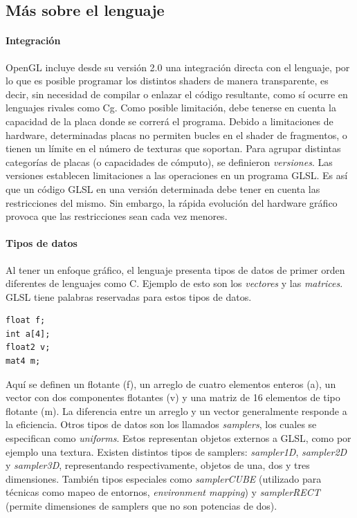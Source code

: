 \subsection{M\'as sobre el lenguaje}
\paragraph{Integración}
OpenGL incluye desde su versión 2.0 una integración directa con el lenguaje, por lo que es posible programar los distintos shaders de manera transparente, es decir, sin necesidad de compilar o enlazar el código resultante, como sí ocurre en lenguajes rivales como Cg.
Como posible limitación, debe tenerse en cuenta la capacidad de la placa donde se correrá el programa.
Debido a limitaciones de hardware, determinadas placas no permiten bucles en el shader de fragmentos, o tienen un límite en el número de texturas que soportan.
Para agrupar distintas categorías de placas (o capacidades de cómputo), se definieron {\em versiones}.
Las versiones establecen limitaciones a las operaciones en un programa GLSL.
Es as\'i que un código GLSL en una versión determinada debe tener en cuenta las restricciones del mismo.
Sin embargo, la r\'apida evoluci\'on del hardware gr\'afico provoca que las restricciones sean cada vez menores.

\paragraph{Tipos de datos}
Al tener un enfoque gr\'afico, el lenguaje presenta tipos de datos de primer orden diferentes de lenguajes como C. Ejemplo de esto son los {\em vectores} y las {\em matrices}.
GLSL tiene palabras reservadas para estos tipos de datos.
\begin{verbatim}
float f;
int a[4];
float2 v;
mat4 m;
\end{verbatim}
Aqu\'i se definen un flotante (f), un arreglo de cuatro elementos enteros (a), un vector con dos componentes flotantes (v) y una matriz de 16 elementos de tipo flotante (m).
La diferencia entre un arreglo y un vector generalmente responde a la eficiencia.
Otros tipos de datos son los llamados {\em samplers}, los cuales se especifican como {\em uniforms}. Estos representan objetos externos a GLSL, como por ejemplo una textura.
Existen distintos tipos de samplers: {\em sampler1D}, {\em sampler2D} y {\em sampler3D}, representando respectivamente, objetos de una, dos y tres dimensiones. Tambi\'en tipos especiales como {\em samplerCUBE} (utilizado para t\'ecnicas como mapeo de entornos, {\em environment mapping}) y {\em samplerRECT} (permite dimensiones de samplers que no son potencias de dos).

